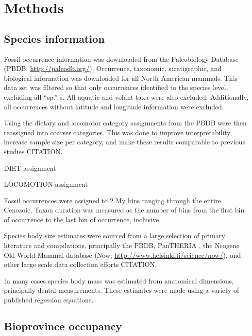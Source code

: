 \documentclass[12pt,letterpaper]{article}
\begin{document}
\section{Methods}

\subsection{Species information}

Fossil occurrence information was downloaded from the Paleobiology Database (PBDB; \url{http://paleodb.org/}). Occurrence, taxonomic, stratigraphic, and biological information was downloaded for all North American mammals. This data set was filtered so that only occurrences identified to the species level, excluding all ``sp.''-s. All aquatic and volant taxa were also excluded. Additionally, all occurrences without latitude and longitude information were excluded.

Using the dietary and locomotor category assignments from the PBDB were then reassigned into coarser categories. This was done to improve interpretability, increase sample size per category, and make these results comparable to previous studies CITATION.

DIET assignment

LOCOMOTION assignment

Fossil occurrences were assigned to 2 My bins ranging through the entire Cenozoic. Taxon duration was measured as the number of bins from the first bin of occurrence to the last bin of occurrence, inclusive.

Species body size estimates were sourced from a large selection of primary literature and compilations, principally the PBDB, PanTHERIA \citep{Jones2009c}, the Neogene Old World Mammal database (Now; \url{http://www.helsinki.fi/science/now/}), and other large scale data collection efforts \citep{Smith2004c, Raia2012f, Brook2004a, Freudenthal2013, McKenna2011} CITATION. %

In many cases species body mass was estimated from anatomical dimensions, principally dental measurements. These estimates were made using a variety of published regession equations. %


\subsection{Bioprovince occupancy}
\end{document}
